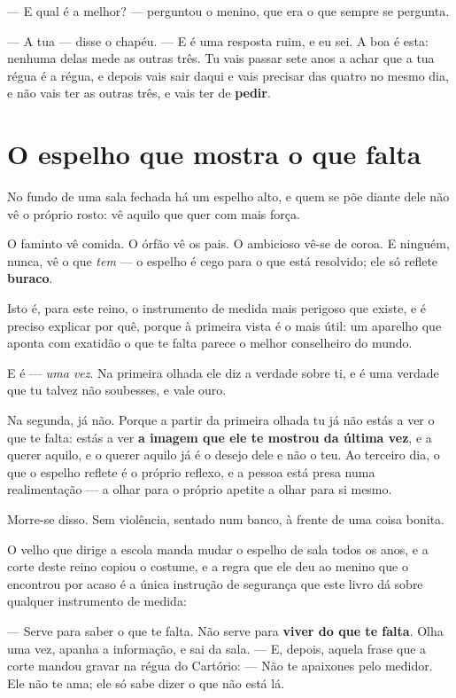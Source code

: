 \documentclass[livro.tex]{subfiles}
\begin{document}
\medskip

--- E qual é a melhor? --- perguntou o menino, que era o que sempre se pergunta.

--- A tua --- disse o chapéu. --- E é uma resposta ruim, e eu sei. A boa é esta: nenhuma
delas mede as outras três. Tu vais passar sete anos a achar que a tua régua é a régua, e
depois vais sair daqui e vais precisar das quatro no mesmo dia, e não vais ter as outras
três, e vais ter de \textbf{pedir}.

\section{O espelho que mostra o que falta}

No fundo de uma sala fechada há um espelho alto, e quem se põe diante dele não vê o
próprio rosto: vê aquilo que quer com mais força.

O faminto vê comida. O órfão vê os pais. O ambicioso vê-se de coroa. E ninguém, nunca, vê
o que \emph{tem} --- o espelho é cego para o que está resolvido; ele só reflete
\textbf{buraco}.

\medskip

Isto é, para este reino, o instrumento de medida mais perigoso que existe, e é preciso
explicar por quê, porque à primeira vista é o mais útil: um aparelho que aponta com
exatidão o que te falta parece o melhor conselheiro do mundo.

E é --- \emph{uma vez}. Na primeira olhada ele diz a verdade sobre ti, e é uma verdade que
tu talvez não soubesses, e vale ouro.

Na segunda, já não. Porque a partir da primeira olhada tu já não estás a ver o que te
falta: estás a ver \textbf{a imagem que ele te mostrou da última vez}, e a querer aquilo,
e o querer aquilo já é o desejo dele e não o teu. Ao terceiro dia, o que o espelho reflete
é o próprio reflexo, e a pessoa está presa numa realimentação --- a olhar para o próprio
apetite a olhar para si mesmo.

Morre-se disso. Sem violência, sentado num banco, à frente de uma coisa bonita.

\medskip

O velho que dirige a escola manda mudar o espelho de sala todos os anos, e a corte deste
reino copiou o costume, e a regra que ele deu ao menino que o encontrou por acaso é a
única instrução de segurança que este livro dá sobre qualquer instrumento de medida:

--- Serve para saber o que te falta. Não serve para \textbf{viver do que te falta}. Olha
uma vez, apanha a informação, e sai da sala. --- E, depois, aquela frase que a corte
mandou gravar na régua do Cartório: --- Não te apaixones pelo medidor. Ele não te ama; ele
só sabe dizer o que não está lá.
\end{document}
